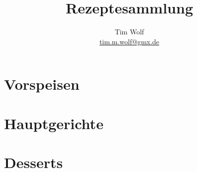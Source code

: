 \documentclass[%
a4paper,
11pt
]{article}
\begin{document}
\title{Rezeptesammlung}
\author{Tim Wolf\\ \href{mailto:tim.m.wolf@gmx.de}{tim.m.wolf@gmx.de}}
\maketitle
\cleardoublepage
%
%
\tableofcontents

\section{Vorspeisen}
\cleardoublepage

\section{Hauptgerichte}





\section{Desserts}

\end{document}

